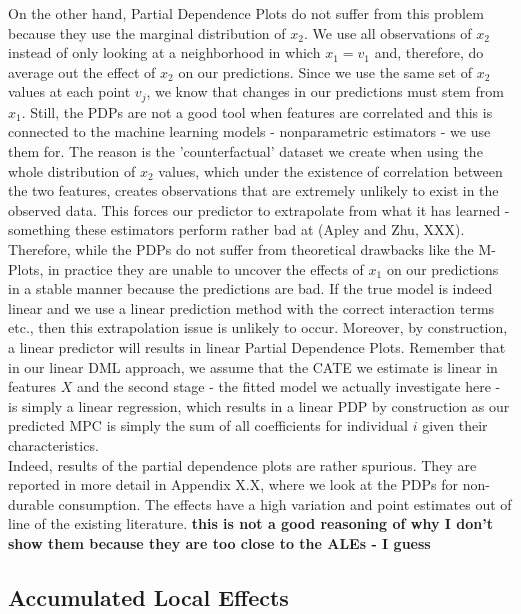 On the other hand, Partial Dependence Plots do not suffer from this problem because they use the marginal distribution of $x_2$. We use all observations of $x_2$ instead of only looking at a neighborhood in which $x_1=v_1$ and, therefore, do average out the effect of $x_2$ on our predictions. Since we use the same set of $x_2$ values at each point $v_j$, we know that changes in our predictions must stem from $x_1.$ Still, the PDPs are not a good tool when features are correlated and this is connected to the machine learning models - nonparametric estimators - we use them for. The reason is the 'counterfactual' dataset we create when using the whole distribution of $x_2$ values, which under the existence of correlation between the two features, creates observations that are extremely unlikely to exist in the observed data. This forces our predictor to extrapolate from what it has learned - something these estimators perform rather bad at (Apley and Zhu, XXX). Therefore, while the PDPs do not suffer from theoretical drawbacks like the M-Plots, in practice they are unable to uncover the effects of $x_1$ on our predictions in a stable manner because the predictions are bad. If the true model is indeed linear and we use a linear prediction method with the correct interaction terms etc., then this extrapolation issue is unlikely to occur. Moreover, by construction, a linear predictor will results in linear Partial Dependence Plots. Remember that in our linear DML approach, we assume that the CATE we estimate is linear in features $X$ and the second stage - the fitted model we actually investigate here - is simply a linear regression, which results in a linear PDP by construction as our predicted MPC is simply the sum of all coefficients for individual $i$ given their characteristics. \\
Indeed, results of the partial dependence plots are rather spurious. They are reported in more detail in Appendix X.X, where we look at the PDPs for non-durable consumption. The effects have a high variation and point estimates out of line of the existing literature. \textbf{this is not a good reasoning of why I don't show them because they are too close to the ALEs - I guess}

\subsection{Accumulated Local Effects}

